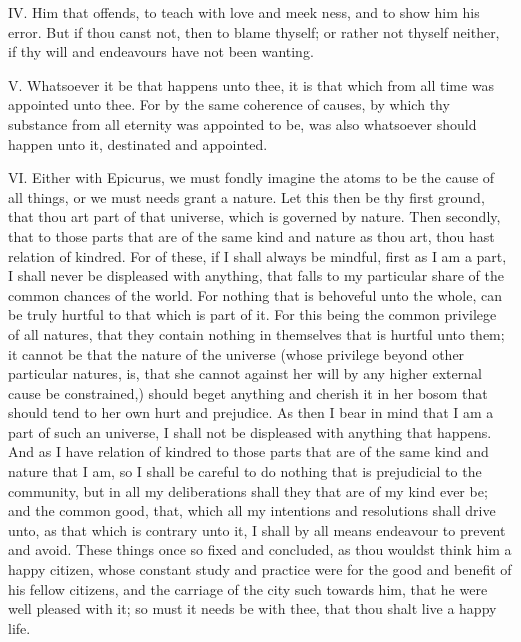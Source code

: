 IV. Him that offends, to teach with love and meek ness, and to show him
his error. But if thou canst not, then to blame thyself; or rather not
thyself neither, if thy will and endeavours have not been wanting.

V. Whatsoever it be that happens unto thee, it is that which from all
time was appointed unto thee. For by the same coherence of causes, by
which thy substance from all eternity was appointed to be, was also
whatsoever should happen unto it, destinated and appointed.

VI. Either with Epicurus, we must fondly imagine the atoms to be the
cause of all things, or we must needs grant a nature. Let this then be thy
first ground, that thou art part of that universe, which is governed by
nature. Then secondly, that to those parts that are of the same kind and
nature as thou art, thou hast relation of kindred. For of these, if I
shall always be mindful, first as I am a part, I shall never be displeased
with anything, that falls to my particular share of the common chances of
the world. For nothing that is behoveful unto the whole, can be truly
hurtful to that which is part of it. For this being the common privilege
of all natures, that they contain nothing in themselves that is hurtful
unto them; it cannot be that the nature of the universe (whose privilege
beyond other particular natures, is, that she cannot against her will by
any higher external cause be constrained,) should beget anything and
cherish it in her bosom that should tend to her own hurt and prejudice. As
then I bear in mind that I am a part of such an universe, I shall not be
displeased with anything that happens. And as I have relation of kindred
to those parts that are of the same kind and nature that I am, so I shall
be careful to do nothing that is prejudicial to the community, but in all
my deliberations shall they that are of my kind ever be; and the common
good, that, which all my intentions and resolutions shall drive unto, as
that which is contrary unto it, I shall by all means endeavour to prevent
and avoid. These things once so fixed and concluded, as thou wouldst think
him a happy citizen, whose constant study and practice were for the good
and benefit of his fellow citizens, and the carriage of the city such
towards him, that he were well pleased with it; so must it needs be with
thee, that thou shalt live a happy life.

